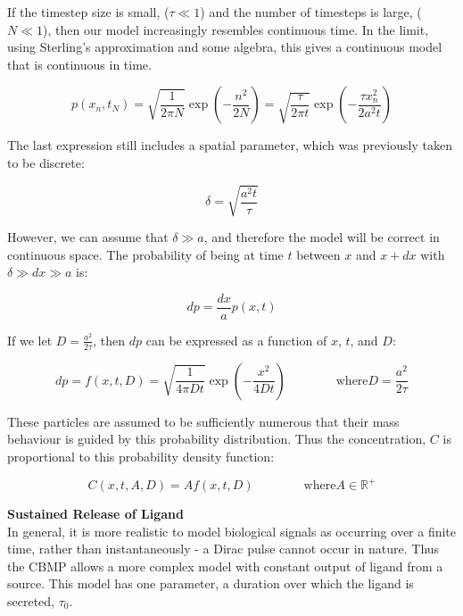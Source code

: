 \documentclass[12pt]{article}
\begin{document}
If the timestep size is small, (\(\tau \ll 1\)) and the number of timesteps is large, 
(\(N \ll 1\)), then our model increasingly resembles continuous time. 
In the limit, using Sterling's approximation 
and some algebra, this gives a continuous model that is continuous in 
time.

\begin{equation}
  p(x_n,t_N) = \sqrt{\frac{1}{2\pi N}}\exp(-\frac{n^2}{2N}) = \sqrt{\frac{\tau}{2\pi t}}\exp(-\frac{\tau x^2_n}{2a^2t})
\end{equation}

The last expression still includes a spatial parameter, which was 
previously taken to be discrete: 

\begin{equation}
  \delta = \sqrt{\frac{a^2t}{\tau}}
\end{equation}

However, we can assume that \(\delta \gg a\), and therefore the 
model will be correct in continuous space. The probability of being at 
time \(t\) between \(x\) and \(x+dx\) with \(\delta \gg dx \gg a\) is:

\begin{equation}
  dp = \frac{dx}{a}p(x,t)
\end{equation}

If we let \(D = \frac{a^2}{2\tau}\), then \(dp\) can be expressed as a 
function of \(x\), \(t\), and \(D\):

\begin{equation}
  dp = f(x,t,D) = \sqrt{\frac{1}{4\pi Dt}} \exp(-\frac{x^2}{4Dt}) \qquad \qquad \text{where} D = \frac{a^2}{2\tau}
\end{equation}

These particles are assumed to be sufficiently numerous that their mass 
behaviour is guided by this probability distribution. Thus the 
concentration, \(C\) is proportional to this probability density function:

\begin{equation}
  C(x,t,A,D) = Af(x,t,D) \qquad \qquad \text{where} A \in \mathbb{R}^+
\end{equation}

{\bfseries Sustained Release of Ligand} \\
In general, it is more realistic to model biological signals as 
occurring over a finite time, rather than instantaneously - a Dirac 
pulse cannot occur in nature. Thus the CBMP allows a more complex model 
with constant output of ligand from a source. This model has one 
parameter, a duration over which the ligand is secreted, \(\tau_0\).
\end{document}
